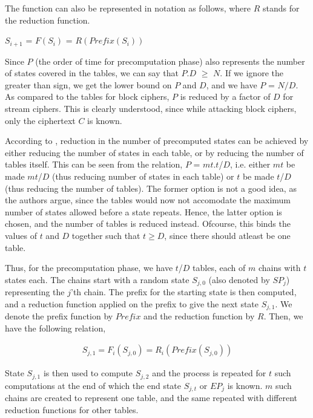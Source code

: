 The function can also be represented in notation as follows, where $R$ stands for the reduction function.

\begin{center}
$S_{i+1}$ = $F(S_i)$ = $R(Prefix(S_i))$\\
\end{center}

Since $P$ (the order of time for precomputation phase) also represents the number of states covered in the tables, we can say that $P$.$D$ $\geq$ $N$. If we ignore the greater than sign, we get the lower bound on $P$ and $D$, and we have $P$ = $N/D$. As compared to the tables for block ciphers, $P$ is reduced by a factor of $D$ for stream ciphers. This is clearly understood, since while attacking block ciphers, only the ciphertext $C$ is known. 

According to \cite{biryukov2000ctm}, reduction in the number of precomputed states can be achieved by either reducing the number of states in each table, or by reducing the number of tables itself. This can be seen from the relation, $P$ = $mt$.$t$/$D$, i.e. either $mt$ be made $mt$/$D$ (thus reducing number of states in each table) or $t$ be made $t$/$D$ (thus reducing the number of tables). The former option is not a good idea, as the authors argue, since the tables would now not accomodate the maximum number of states allowed before a state repeats. Hence, the latter option is chosen, and the number of tables is reduced instead. Ofcourse, this binds the values of $t$ and $D$ together such that $t \geq D$, since there should atleast be one table. 

Thus, for the precomputation phase, we have $t$/$D$ tables, each of $m$ chains with $t$ states each. The chains start with a random state $S_{j,0}$ (also denoted by $SP_j$) representing the $j$'th chain. The prefix for the starting state is then computed, and a reduction function applied on the prefix to give the next state $S_{j,1}$. We denote the prefix function by $Prefix$ and the reduction function by $R$. Then, we have the following relation,

\begin{align*}
S_{j,1} = F_i(S_{j,0}) = R_i(Prefix(S_{j,0}))
\end{align*}  

State $S_{j,1}$ is then used to compute $S_{j,2}$ and the process is repeated for $t$ such computations at the end of which the end state $S_{j,t}$ or $EP_j$ is known. $m$ such chains are created to represent one table, and the same repeated with different reduction functions for other tables. 

